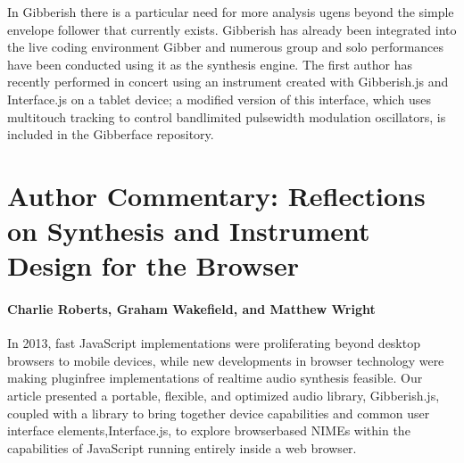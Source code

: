 In Gibberish there is a particular need for more analysis ugens beyond the simple envelope follower that currently exists. Gibberish has already been integrated into the live coding environment Gibber and numerous group and solo performances have been conducted using it as the synthesis engine. The first author has recently performed in concert using an instrument created with Gibberish.js and Interface.js on a tablet device; a modified version of this interface, which uses multitouch tracking to control bandlimited pulsewidth modulation oscillators, is included in the Gibberface repository.


\section*{Author Commentary: Reflections on Synthesis and Instrument Design for the Browser}

\paragraph{Charlie Roberts, Graham Wakefield, and Matthew Wright} 
 
In 2013, fast JavaScript implementations were proliferating beyond desktop browsers to mobile devices, while new developments in browser technology were making plugin­free implementations of real­time audio synthesis feasible. Our article presented a portable, flexible, and optimized audio library, Gibberish.js, coupled with a library to bring together device capabilities and common user interface elements, ​Interface.js, to explore browser­based NIMEs within the capabilities of JavaScript running entirely inside a web browser.
 
